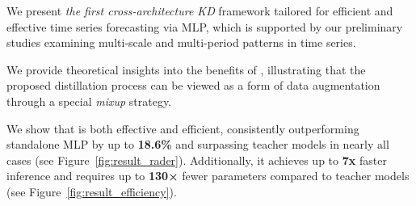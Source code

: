 \begin{compactenum}[(a)] 

\item We present \textit{the first cross-architecture KD} framework \method{} tailored for efficient and effective time series forecasting via MLP, which is supported by our preliminary studies examining multi-scale and multi-period patterns in time series.


\item We provide theoretical insights into the benefits of \method{}, illustrating that the proposed distillation process can be viewed as a form of data augmentation through a special \textit{mixup} strategy.




\item We show that \method{} is both effective and efficient, consistently outperforming standalone MLP by up to \textbf{18.6\%} and surpassing teacher models in nearly all cases (see Figure~\ref{fig:result_rader}). Additionally, it achieves up to \textbf{7x} faster inference and requires up to \textbf{130×} fewer parameters compared to teacher models (see Figure~\ref{fig:result_efficiency}).



\end{compactenum}
